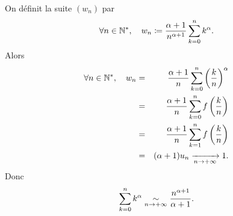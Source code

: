 \documentclass{magnolia}
\begin{document}
\begin{sol}
\begin{questions}
  On définit la suite $(w_n)$ par
  \[\forall n\in{\mathbb{N}^*},\quad w_n\coloneqq \frac{\alpha+1}{n^{\alpha+1}}\sum_{k=0}^n k^\alpha.\]
  Alors
  \begin{eqnarray*}
\forall n\in{\mathbb{N}^*},\quad w_n
&=& \frac{\alpha+1}{n}\sum_{k=0}^n \left(\frac{k}{n}\right)^\alpha\\
&=& \frac{\alpha+1}{n}\sum_{k=0}^n f\left(\frac{k}{n}\right)\\
&=& \frac{\alpha+1}{n}\sum_{k=1}^n f\left(\frac{k}{n}\right)\\
&=& (\alpha+1)u_n \xrightarrow[n\rightarrow +\infty]{} 1.
  \end{eqnarray*}
  Donc
\[\sum_{k=0}^n k^\alpha\underset{n\rightarrow +\infty}{\sim}\frac{n^{\alpha+1}}{\alpha+1}.\]
\end{questions}
\end{sol}

\end{document}
